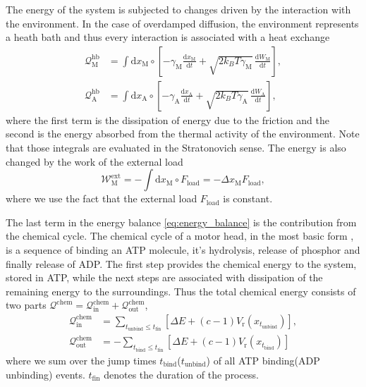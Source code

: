 \documentclass[aps,pre,twocolumn,showpacs,showkeys,superscriptaddress,floatfix]{revtex4-1}
\newcommand{\rmd}{{\mathrm d}}
\begin{document}
The energy of the system is subjected to changes driven by the interaction with the environment.
In the case of overdamped diffusion, the environment represents a heath bath
and thus every interaction is associated with a heat exchange \cite{Pesek2013}
\begin{align}
{\mathcal Q}_\text{M}^\text{hb} 
&= \int \rmd x_\text{M} \circ \left[ - \gamma_\text{M} \frac{\rmd x_\text{M} }{\rmd t} + \sqrt{ 2 k_B T \gamma_\text{M} } \, \frac{ \rmd W_\text{M} }{ \rmd t } \right] , 
\label{eq:heat_hb_M} \\
{\mathcal Q}_\text{A}^\text{hb} 
&= \int \rmd x_\text{A} \circ \left[ - \gamma_\text{A} \frac{\rmd x_\text{A} }{\rmd t} + \sqrt{ 2 k_B T \gamma_\text{A} } \, \frac{ \rmd W_\text{A} }{ \rmd t } \right] ,
\label{eq:heat_hb_A}
\end{align} 
where the first term is the dissipation of energy due to the friction and the second is the energy absorbed from the thermal activity of the environment.
Note that those integrals are evaluated in the Stratonovich sense.
The energy is also changed by the work of the external load 
\begin{equation}
{\mathcal W}^\text{ext}_\text{M} = - \int \rmd x_\text{M} \circ F_\text{load} = - \Delta x_\text{M} F_\text{load}, 
\label{eq:work_load}
\end{equation}
where we use the fact that the external load $F_\text{load}$ is constant. 

The last term in the energy balance \eqref{eq:energy_balance} is the contribution from the chemical cycle. 
The chemical cycle of a motor head, in the most basic form \cite{astumian1996mechanochemical,Bierbaum2011,Bierbaum2013,Albert2014}, is a sequence of binding an ATP molecule, it's hydrolysis, release of phosphor and finally release of ADP.
The first step provides the chemical energy to the system, stored in ATP, while the next steps are associated with dissipation of the remaining energy to the surroundings.
Thus the total chemical energy consists of two parts ${\mathcal Q}^\text{chem} = {\mathcal Q}^\text{chem}_\text{in} + {\mathcal Q}^\text{chem}_\text{out}$,
\begin{align}
{\mathcal Q}_\text{in}^\text{chem} 
&= \sum_{t_\text{unbind} \leq t_\text{fin} } \left[ \Delta E + (c-1) V_\text{r}(x_{t_\text{unbind}}) \right] , 
\label{eq:q_in} \\
{\mathcal Q}_\text{out}^\text{chem} 
&= -\sum_{t_\text{bind} \leq t_\text{fin} } \left[ \Delta E + (c-1) V_\text{r}(x_{t_\text{bind}}) \right] 
\label{eq:q_out}
\end{align}
where we sum over the jump times $t_\text{bind}$($t_\text{unbind}$) of all ATP binding(ADP unbinding) events.
$t_\text{fin}$ denotes the duration of the process. 
\end{document}
